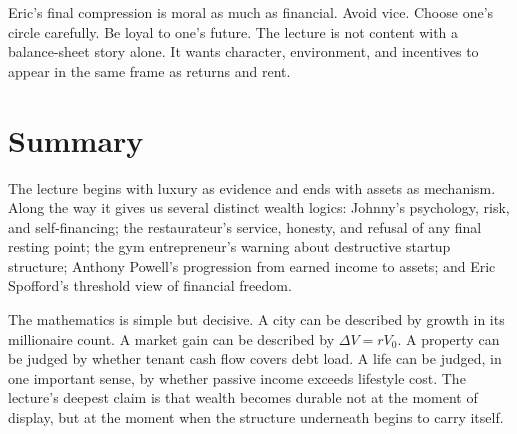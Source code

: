 Eric's final compression is moral as much as financial. Avoid vice. Choose one's circle carefully. Be loyal to one's future. The lecture is not content with a balance-sheet story alone. It wants character, environment, and incentives to appear in the same frame as returns and rent.

\section{Summary}

The lecture begins with luxury as evidence and ends with assets as mechanism. Along the way it gives us several distinct wealth logics: Johnny's psychology, risk, and self-financing; the restaurateur's service, honesty, and refusal of any final resting point; the gym entrepreneur's warning about destructive startup structure; Anthony Powell's progression from earned income to assets; and Eric Spofford's threshold view of financial freedom.

The mathematics is simple but decisive. A city can be described by growth in its millionaire count. A market gain can be described by \(\Delta V=rV_0\). A property can be judged by whether tenant cash flow covers debt load. A life can be judged, in one important sense, by whether passive income exceeds lifestyle cost. The lecture's deepest claim is that wealth becomes durable not at the moment of display, but at the moment when the structure underneath begins to carry itself.